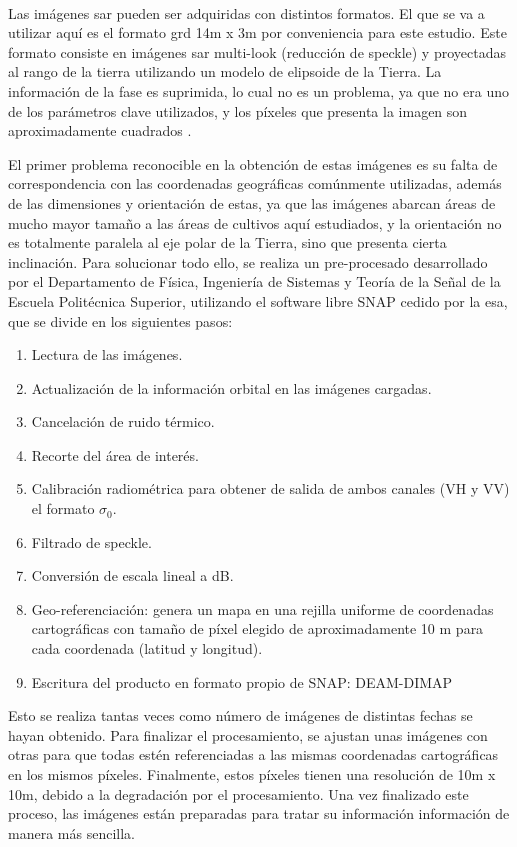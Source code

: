 \\
\par Las imágenes \gls{sar} pueden ser adquiridas con distintos formatos. El que se va a utilizar aquí es el formato \gls{grd} 14m x 3m por conveniencia para este estudio. Este formato consiste en imágenes \gls{sar} multi-look (reducción de speckle) y proyectadas al rango de la tierra utilizando un modelo de elipsoide de la Tierra. La información de la fase es suprimida, lo cual no es un problema, ya que no era uno de los parámetros clave utilizados, y los píxeles que presenta la imagen son aproximadamente cuadrados \cite{copData}. 
\\
\par El primer problema reconocible en la obtención de estas imágenes es su falta de correspondencia con las coordenadas geográficas comúnmente utilizadas, además de las dimensiones y orientación de estas, ya que las imágenes abarcan áreas de mucho mayor tamaño a las áreas de cultivos aquí estudiados, y la orientación no es totalmente paralela al eje polar de la Tierra, sino que presenta cierta inclinación. Para solucionar todo ello, se realiza un pre-procesado desarrollado por el Departamento de Física, Ingeniería de Sistemas y Teoría de la Señal de la Escuela Politécnica Superior, utilizando el software libre SNAP cedido por la \gls{esa}, que se divide en los siguientes pasos:
\begin{enumerate}
	\item Lectura de las imágenes.
	\item Actualización de la información orbital en las imágenes cargadas.
	\item Cancelación de ruido térmico.
	\item Recorte del área de interés.
	\item Calibración radiométrica para obtener de salida de ambos canales (VH y VV) el formato $\sigma_{0}$.
	\item Filtrado de speckle.
	\item Conversión de escala lineal a dB.
	\item Geo-referenciación: genera un mapa en una rejilla uniforme de
coordenadas cartográficas con tamaño de píxel elegido de aproximadamente 10 m para cada coordenada (latitud y longitud).
	\item Escritura del producto en formato propio de SNAP: DEAM-DIMAP 
\end{enumerate}
\par Esto se realiza tantas veces como número de imágenes de distintas fechas se hayan obtenido. Para finalizar el procesamiento, se ajustan unas imágenes con otras para que todas estén referenciadas a las mismas coordenadas cartográficas en los mismos píxeles. Finalmente, estos píxeles tienen una resolución de 10m x 10m, debido a la degradación por el procesamiento. Una vez finalizado este proceso, las imágenes están preparadas para tratar su información información de manera más sencilla.  


